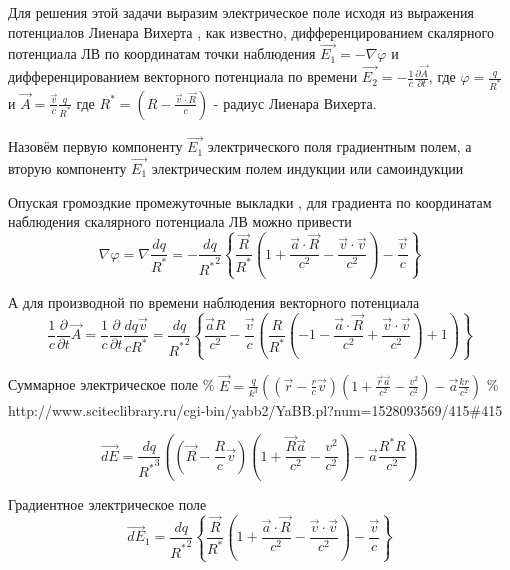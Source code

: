 \documentclass[11pt]{article}
\begin{document}
Для решения этой задачи выразим электрическое поле исходя из выражения
потенциалов Лиенара Вихерта \cite{LL2}, как известно, дифференцированием
скалярного потенциала ЛВ по координатам точки наблюдения
\(\overrightarrow{E_1} = - \nabla\varphi\) и дифференцированием
векторного потенциала по времени
\(\overrightarrow{E_2}=-\frac{1}{c}\frac{\partial \overrightarrow{A}}{\partial t}\),
где \(\varphi=\frac{q}{{{R}^{*}}}\) и
\(\overrightarrow{A}=\frac{\overrightarrow{v}}{c}\frac{q}{{{R}^{*}}}\)
где
\({{R}^{*}}=\left( R-\frac{\overrightarrow{v}\cdot \overrightarrow{R}}{c} \right)\)
- радиус Лиенара Вихерта.

    Назовём первую компоненту \(\overrightarrow{E_1}\) электрического поля
градиентным полем, а вторую компоненту \(\overrightarrow{E_1}\)
электрическим полем индукции или самоиндукции

Опуская громоздкие промежуточные выкладки \cite{rustot}, для градиента
по координатам наблюдения скалярного потенциала ЛВ можно привести
\[\nabla \varphi =\nabla \frac{dq}{{{R}^{*}}}=-\frac{dq}{{{R}^{*}}^{2}}\left\{ \frac{\overrightarrow{R}}{{{R}^{*}}}\left( 1+\frac{\overrightarrow{a}\cdot \overrightarrow{R}}{{{c}^{2}}}-\frac{\overrightarrow{v}\cdot \overrightarrow{v}}{{{c}^{2}}} \right)-\frac{\overrightarrow{v}}{c} \right\}\]

А для производной по времени наблюдения векторного потенциала
\[\frac{1}{c}\frac{\partial }{\partial t}\overrightarrow{A}=\frac{1}{c}\frac{\partial }{\partial t}\frac{dq\overrightarrow{v}}{c{{R}^{*}}}=\frac{dq}{{{R}^{*}}^{2}}\left\{ \frac{\overrightarrow{a}R}{{{c}^{2}}}-\frac{\overrightarrow{v}}{c}\left( \frac{R}{{{R}^{*}}}\left( -1-\frac{\overrightarrow{a}\cdot \overrightarrow{R}}{{{c}^{2}}}+\frac{\overrightarrow{v}\cdot \overrightarrow{v}}{{{c}^{2}}} \right)+1 \right) \right\}\]

    Суммарное электрическое поле \%
\(\vec{E} = \frac{q}{k^3}((\vec{r}-\frac{r}{c}\vec{v})(1 + \frac{\vec{r}\vec{a}}{c^2} - \frac{v^2}{c^2}) - \vec{a}\frac{kr}{c^2})\)
\%
http://www.sciteclibrary.ru/cgi-bin/yabb2/YaBB.pl?num=1528093569/415\#415

\[\vec{dE} = \frac{dq}{{{R}^{*}}^{3}}\left( \left(\vec{R}-\frac{R}{c}\vec{v} \right) \left(1 + \frac{\vec{R}\vec{a}}{c^2} - \frac{v^2}{c^2} \right) - \vec{a}\frac{{R}^{*}R}{c^2} \right)\]

Градиентное электрическое поле
\[\overrightarrow{dE}_{1}=\frac{dq}{{{R}^{*}}^{2}}\left\{ \frac{\overrightarrow{R}}{{{R}^{*}}}\left( 1+\frac{\overrightarrow{a}\cdot \overrightarrow{R}}{{{c}^{2}}}-\frac{\overrightarrow{v}\cdot \overrightarrow{v}}{{{c}^{2}}} \right)-\frac{\overrightarrow{v}}{c} \right\}\]
\end{document}
